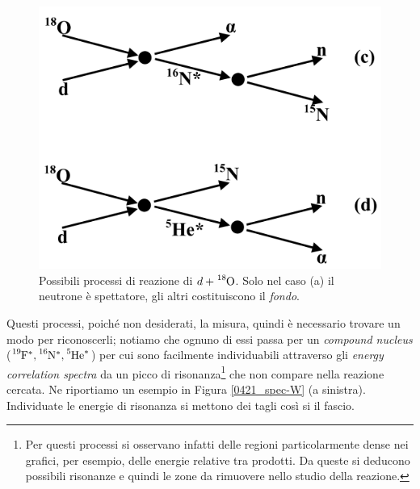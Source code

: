 \begin{enumerate}
\begin{figure}[!h]
		\includegraphics[scale=0.5]{Immagini/0421_sch-cut2.png}
		\caption{Possibili processi di reazione di $d+\ce{^{18}O}$. Solo nel caso (a) il neutrone è spettatore, gli altri costituiscono il \textit{fondo}.}
		\label{0421_sch}
	\end{figure}
	\noindent Questi processi, poiché non desiderati,  la misura, quindi è necessario trovare un modo per riconoscerli; notiamo che ognuno di essi passa per un \textit{compound nucleus} ($\ce{^{19}F}^*, \ce{^{16}N}^*,\ce{^5He}^*$) per cui sono facilmente individuabili attraverso gli \textit{energy correlation spectra} da un picco di risonanza\footnote{Per questi processi si osservano infatti delle regioni particolarmente dense nei grafici, per esempio, delle energie relative tra prodotti. Da queste si deducono possibili risonanze e quindi le zone da rimuovere nello studio della reazione.} che non compare nella reazione cercata. Ne riportiamo un esempio in Figura \ref{0421_spec-W} (a sinistra). Individuate le energie di risonanza si mettono dei tagli così si  il fascio.
	\begin{figure}[!h]
		\centering

\end{figure}
\end{enumerate}
